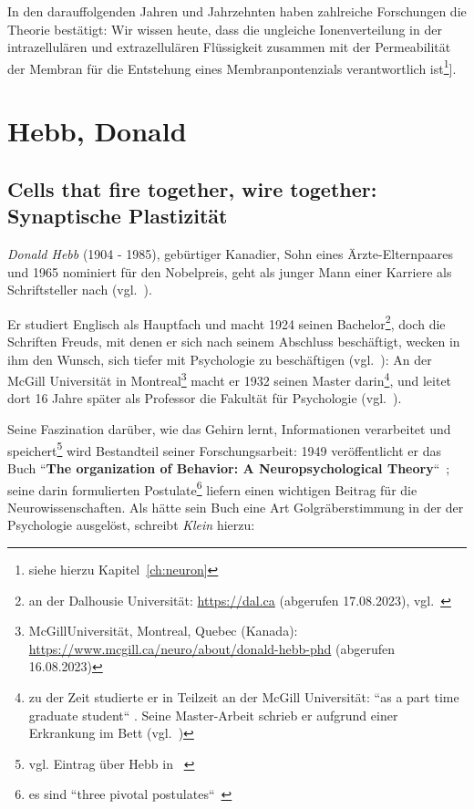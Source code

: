 In den darauffolgenden Jahren und Jahrzehnten haben zahlreiche Forschungen die Theorie bestätigt: Wir wissen heute, dass die ungleiche Ionenverteilung in der intrazellulären und extrazellulären Flüssigkeit zusammen mit der Permeabilität der Membran für die Entstehung eines Membranpontenzials verantwortlich ist\footnote{siehe hierzu Kapitel~\ref{ch:neuron}}].

\section{Hebb, Donald}\label{appendix:hebb}
\subsection*{Cells that fire together, wire together: Synaptische Plastizität}

\textit{Donald Hebb} (1904 - 1985), gebürtiger Kanadier, Sohn eines Ärzte-Elternpaares und 1965 nominiert für den Nobelpreis, geht als junger Mann einer Karriere als Schriftsteller nach (vgl.~\cite[1013 f.]{BM03}).

Er studiert Englisch als Hauptfach und macht 1924 seinen Bachelor\footnote{
    an der Dalhousie Universität: \url{https://dal.ca} (abgerufen 17.08.2023), vgl.~\cite[852]{Coo05}
}, doch die Schriften Freuds, mit denen er sich nach seinem Abschluss beschäftigt, wecken in ihm den Wunsch, sich tiefer mit Psychologie zu beschäftigen (vgl.~\cite[1013]{BM03}): An der McGill Universität in Montreal\footnote{
    McGillUniversität, Montreal, Quebec (Kanada): \url{https://www.mcgill.ca/neuro/about/donald-hebb-phd} (abgerufen 16.08.2023)
} macht er 1932 seinen Master darin\footnote{
    zu der Zeit studierte er in Teilzeit an der McGill Universität: ``as a part time graduate student`` \cite[1]{Kle99}. Seine Master-Arbeit schrieb er aufgrund einer Erkrankung im Bett (vgl.~\cite[1014]{BM03})
}, und leitet dort 16 Jahre später als Professor die Fakultät für Psychologie (vgl.~\cite[853]{Coo05}).

Seine Faszination darüber, wie das Gehirn lernt, Informationen verarbeitet und speichert\footnote{vgl. Eintrag über Hebb in ~\cite[298 f.]{Str01}} wird Bestandteil seiner Forschungsarbeit: 1949 veröffentlicht er das Buch ``\textbf{The organization of Behavior: A Neuropsychological Theory}``~\cite{Heb49}; seine darin formulierten Postulate\footnote{
    es sind ``three pivotal postulates``~\cite[2]{Kle99}
} liefern einen wichtigen Beitrag für die Neurowissenschaften. Als hätte sein Buch eine Art Golgräberstimmung in der der Psychologie ausgelöst, schreibt \textit{Klein} hierzu:

